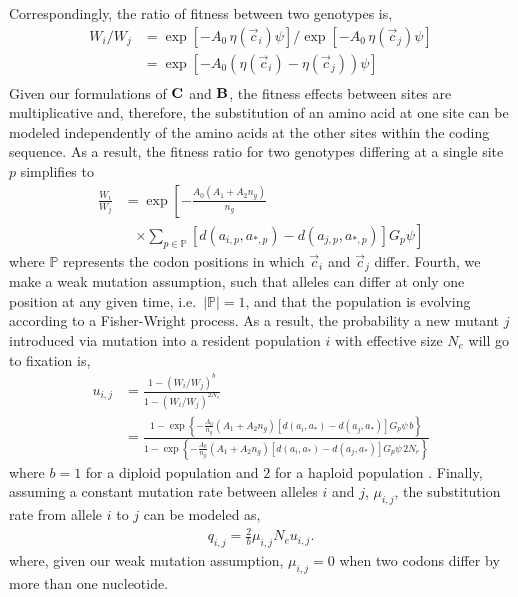 \documentclass[12pt,letterpaper]{article}
\newcommand{\Cost}{\ensuremath{\text{\textbf{C}}}\xspace}
\newcommand{\Func}{\ensuremath{\text{\textbf{B}}}\xspace}
\newcommand{\Ne}{\ensuremath{{N_e}}\xspace} %
\newcommand{\aip}{\ensuremath{a_{i,p}}\xspace}
\newcommand{\ajp}{\ensuremath{a_{j,p}}\xspace}
\newcommand{\aopt}{\ensuremath{a_*}\xspace}
\newcommand{\aoptp}{\ensuremath{a_{*,p}}\xspace}
\newcommand{\cveci}{\ensuremath{\cvec_i}\xspace}
\newcommand{\cvecj}{\ensuremath{\cvec_j}\xspace}
\newcommand{\cvec}{\ensuremath{\Vec{c}}\xspace}
\newcommand{\muij}{\ensuremath{\mu_{i,j}}\xspace}
\newcommand{\setP}{\ensuremath{\mathbb{P}}\xspace}
\renewcommand{\ng}{\ensuremath{{n_g}}\xspace}
\begin{document}
Correspondingly, the ratio of fitness between two genotypes is,
\begin{align}
  W_i/W_j &=  \exp\left[- A_0 \, \eta(\cveci) \psi\right]/\exp\left[- A_0 \, \eta(\cvecj) \psi\right]\\ 
  &=  \exp\left[- A_0 \left(\eta(\cveci)- \eta(\cvecj)\right) \psi\right] \label{eq:Wratio}\\
\end{align}
Given our formulations of \Cost and \Func, the fitness effects between sites are multiplicative and, therefore, the substitution of an amino acid at one site can be modeled independently of the amino acids at the other sites within the coding sequence.
As a result, the fitness ratio for two genotypes differing at a single site $p$ simplifies to
\begin{align*}
  \frac{W_i}{W_j}  &= \exp\left[- \frac{A_0 \left(A_1 + A_2 \ng\right)}{\ng} \right.\\ 
  & \;\;\;  \left. \times \sum_{p \in \setP} \left[d\left(\aip,\aoptp\right) - d\left(\ajp,\aoptp\right)\right] G_p \psi \right]
\end{align*}
where \setP represents the codon positions in which \cveci and \cvecj differ.
Fourth, we make a weak mutation assumption, such that alleles can differ at only one position at any given time, i.e.~$|\setP| = 1$, and that the population is evolving according to a Fisher-Wright process.
As a result, the probability a new mutant $j$ introduced via mutation into a resident population $i$ with effective size \Ne will go to fixation is,
\begin{align*}
  u_{i,j} &=  \frac{1 - \left(W_i/W_j\right)^b}{1 - \left(W_i/W_j\right)^{2 \Ne}}\\
   &= \frac{1- \exp\left\{- \frac{A_0}{\ng} \left(A_1 + A_2 \ng\right) \left[d\left(a_i,\aopt\right) - d\left(a_j,\aopt\right)\right] G_p \psi \,  b\right\}}  {1-\exp\left\{- \frac{A_0}{\ng} \left(A_1 + A_2 \ng\right) \left[d\left(a_i,\aopt\right) - d\left(a_j,\aopt\right)\right] G_p \psi \, 2\Ne\right\}}
\end{align*}
where $b=1$ for a diploid population and $2$ for a haploid population \citep{Kimura1962,Wright1969,Iwasa1988,BergAndLassig2003,SellaAndHirsh2005}.
Finally, assuming a constant mutation rate between alleles $i$ and $j$, $\muij$, the substitution rate from allele $i$ to $j$ can be modeled as,
\begin{align*}
  q_{i,j} = \frac{2}{b} \muij \Ne u_{i,j}.
\end{align*}
where, given our weak mutation assumption, $\muij = 0$ when two codons differ by more than one nucleotide.
\end{document}

